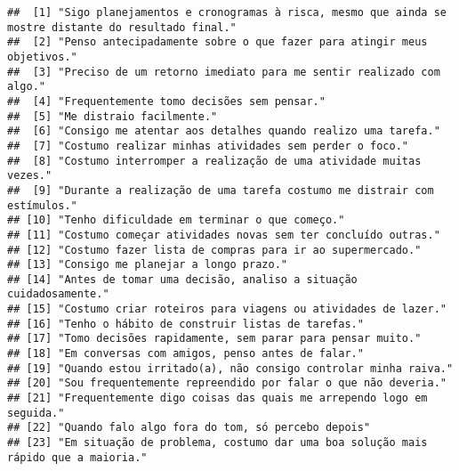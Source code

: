 \documentclass[
]{article}
\begin{document}
\begin{verbatim}
##  [1] "Sigo planejamentos e cronogramas à risca, mesmo que ainda se mostre distante do resultado final."       
##  [2] "Penso antecipadamente sobre o que fazer para atingir meus objetivos."                                   
##  [3] "Preciso de um retorno imediato para me sentir realizado com algo."                                      
##  [4] "Frequentemente tomo decisões sem pensar."                                                               
##  [5] "Me distraio facilmente."                                                                                
##  [6] "Consigo me atentar aos detalhes quando realizo uma tarefa."                                             
##  [7] "Costumo realizar minhas atividades sem perder o foco."                                                  
##  [8] "Costumo interromper a realização de uma atividade muitas vezes."                                        
##  [9] "Durante a realização de uma tarefa costumo me distrair com estímulos."                                  
## [10] "Tenho dificuldade em terminar o que começo."                                                            
## [11] "Costumo começar atividades novas sem ter concluído outras."                                             
## [12] "Costumo fazer lista de compras para ir ao supermercado."                                                
## [13] "Consigo me planejar a longo prazo."                                                                     
## [14] "Antes de tomar uma decisão, analiso a situação cuidadosamente."                                         
## [15] "Costumo criar roteiros para viagens ou atividades de lazer."                                            
## [16] "Tenho o hábito de construir listas de tarefas."                                                         
## [17] "Tomo decisões rapidamente, sem parar para pensar muito."                                                
## [18] "Em conversas com amigos, penso antes de falar."                                                         
## [19] "Quando estou irritado(a), não consigo controlar minha raiva."                                           
## [20] "Sou frequentemente repreendido por falar o que não deveria."                                            
## [21] "Frequentemente digo coisas das quais me arrependo logo em seguida."                                     
## [22] "Quando falo algo fora do tom, só percebo depois"                                                        
## [23] "Em situação de problema, costumo dar uma boa solução mais rápido que a maioria."                        

\end{verbatim}
\end{document}
